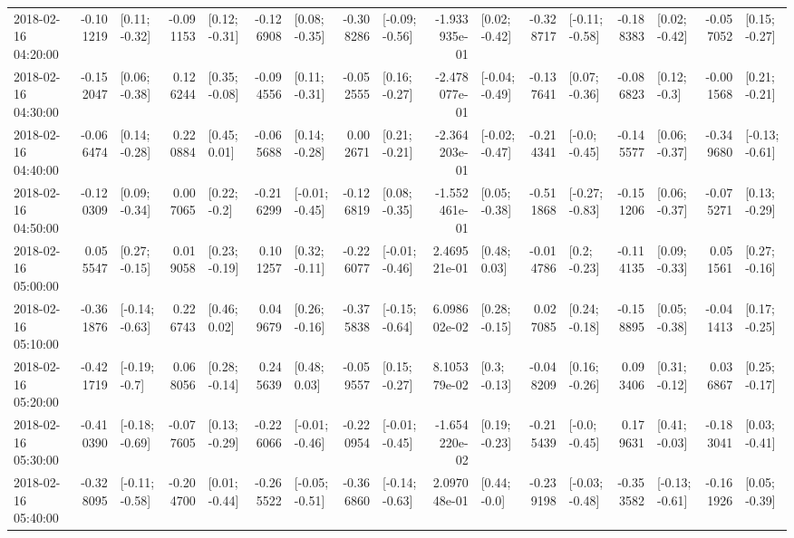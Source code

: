 \begin{tabular}{lrlrlrlrlrlrlrlrl}
2018-02-16 04:20:00 & -0.101219 &   [0.11; -0.32] & -0.091153 &   [0.12; -0.31] & -0.126908 &   [0.08; -0.35] & -0.308286 &  [-0.09; -0.56] & -1.933935e-01 &   [0.02; -0.42] & -0.328717 &  [-0.11; -0.58] & -0.188383 &   [0.02; -0.42] & -0.057052 &   [0.15; -0.27] \\
2018-02-16 04:30:00 & -0.152047 &   [0.06; -0.38] &  0.126244 &   [0.35; -0.08] & -0.094556 &   [0.11; -0.31] & -0.052555 &   [0.16; -0.27] & -2.478077e-01 &  [-0.04; -0.49] & -0.137641 &   [0.07; -0.36] & -0.086823 &    [0.12; -0.3] & -0.001568 &   [0.21; -0.21] \\
2018-02-16 04:40:00 & -0.066474 &   [0.14; -0.28] &  0.220884 &    [0.45; 0.01] & -0.065688 &   [0.14; -0.28] &  0.002671 &   [0.21; -0.21] & -2.364203e-01 &  [-0.02; -0.47] & -0.214341 &   [-0.0; -0.45] & -0.145577 &   [0.06; -0.37] & -0.349680 &  [-0.13; -0.61] \\
2018-02-16 04:50:00 & -0.120309 &   [0.09; -0.34] &  0.007065 &    [0.22; -0.2] & -0.216299 &  [-0.01; -0.45] & -0.126819 &   [0.08; -0.35] & -1.552461e-01 &   [0.05; -0.38] & -0.511868 &  [-0.27; -0.83] & -0.151206 &   [0.06; -0.37] & -0.075271 &   [0.13; -0.29] \\
2018-02-16 05:00:00 &  0.055547 &   [0.27; -0.15] &  0.019058 &   [0.23; -0.19] &  0.101257 &   [0.32; -0.11] & -0.226077 &  [-0.01; -0.46] &  2.469521e-01 &    [0.48; 0.03] & -0.014786 &    [0.2; -0.23] & -0.114135 &   [0.09; -0.33] &  0.051561 &   [0.27; -0.16] \\
2018-02-16 05:10:00 & -0.361876 &  [-0.14; -0.63] &  0.226743 &    [0.46; 0.02] &  0.049679 &   [0.26; -0.16] & -0.375838 &  [-0.15; -0.64] &  6.098602e-02 &   [0.28; -0.15] &  0.027085 &   [0.24; -0.18] & -0.158895 &   [0.05; -0.38] & -0.041413 &   [0.17; -0.25] \\
2018-02-16 05:20:00 & -0.421719 &   [-0.19; -0.7] &  0.068056 &   [0.28; -0.14] &  0.245639 &    [0.48; 0.03] & -0.059557 &   [0.15; -0.27] &  8.105379e-02 &    [0.3; -0.13] & -0.048209 &   [0.16; -0.26] &  0.093406 &   [0.31; -0.12] &  0.036867 &   [0.25; -0.17] \\
2018-02-16 05:30:00 & -0.410390 &  [-0.18; -0.69] & -0.077605 &   [0.13; -0.29] & -0.226066 &  [-0.01; -0.46] & -0.220954 &  [-0.01; -0.45] & -1.654220e-02 &   [0.19; -0.23] & -0.215439 &   [-0.0; -0.45] &  0.179631 &   [0.41; -0.03] & -0.183041 &   [0.03; -0.41] \\
2018-02-16 05:40:00 & -0.328095 &  [-0.11; -0.58] & -0.204700 &   [0.01; -0.44] & -0.265522 &  [-0.05; -0.51] & -0.366860 &  [-0.14; -0.63] &  2.097048e-01 &    [0.44; -0.0] & -0.239198 &  [-0.03; -0.48] & -0.353582 &  [-0.13; -0.61] & -0.161926 &   [0.05; -0.39] \\

\end{tabular}
